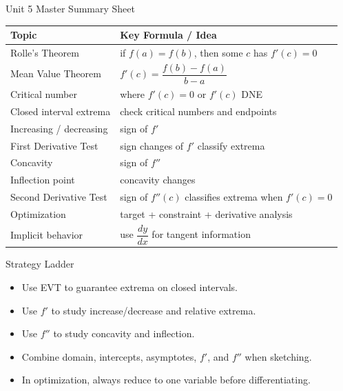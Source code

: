 \documentclass[11pt]{article}
\begin{document}
\begin{summarybox}{Unit 5 Master Summary Sheet}
\renewcommand{\arraystretch}{1.35}
\begin{tabularx}{\textwidth}{@{}p{}X@{}}
\toprule
\textbf{Topic} & \textbf{Key Formula / Idea} \\
\midrule
Rolle’s Theorem & if $f(a)=f(b)$, then some $c$ has $f'(c)=0$ \\

Mean Value Theorem & $f'(c)=\dfrac{f(b)-f(a)}{b-a}$ \\

Critical number & where $f'(c)=0$ or $f'(c)$ DNE \\

Closed interval extrema & check critical numbers and endpoints \\

Increasing / decreasing & sign of $f'$ \\

First Derivative Test & sign changes of $f'$ classify extrema \\

Concavity & sign of $f''$ \\

Inflection point & concavity changes \\

Second Derivative Test & sign of $f''(c)$ classifies extrema when $f'(c)=0$ \\

Optimization & target + constraint + derivative analysis \\

Implicit behavior & use $\dfrac{dy}{dx}$ for tangent information \\
\bottomrule
\end{tabularx}
\end{summarybox}

\vspace{1em}

\begin{summarybox}{Strategy Ladder}
\begin{itemize}
    \item Use EVT to guarantee extrema on closed intervals.
    \item Use $f'$ to study increase/decrease and relative extrema.
    \item Use $f''$ to study concavity and inflection.
    \item Combine domain, intercepts, asymptotes, $f'$, and $f''$ when sketching.
    \item In optimization, always reduce to one variable before differentiating.
\end{itemize}
\end{summarybox}
\end{document}
